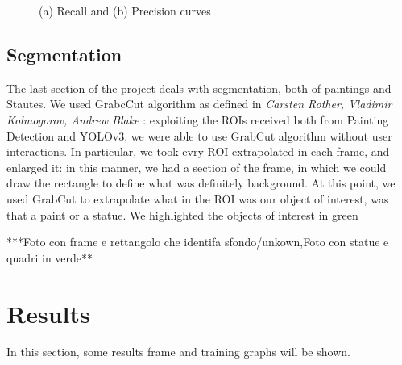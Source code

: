 \documentclass[10pt,twocolumn,letterpaper]{article}
\begin{document}
\begin{figure}
    \centering
    \caption{(a) Recall  and (b) Precision curves}
    \label{fig:foobar}
\end{figure}

\subsection{Segmentation}
The last section of the project deals with segmentation, both of paintings and Stautes.
We used GrabcCut algorithm as defined in \textit{Carsten Rother, Vladimir Kolmogorov, Andrew Blake} \cite{grabcut}
: exploiting the ROIs received both from Painting Detection and YOLOv3, we were able to use GrabCut algorithm without user interactions.
In particular, we took evry ROI extrapolated in each frame, and enlarged it: in this manner, we had a section of the frame, in which we could draw the rectangle to define what was definitely background.
At this point, we used GrabCut to extrapolate what in the ROI was our object of interest, was that a paint or a statue.
We highlighted the objects of interest in green


***Foto con frame e rettangolo che identifa sfondo/unkown,Foto con statue e quadri in verde**
\section{Results}

In this section, some results frame and training graphs will be shown.
\end{document}
